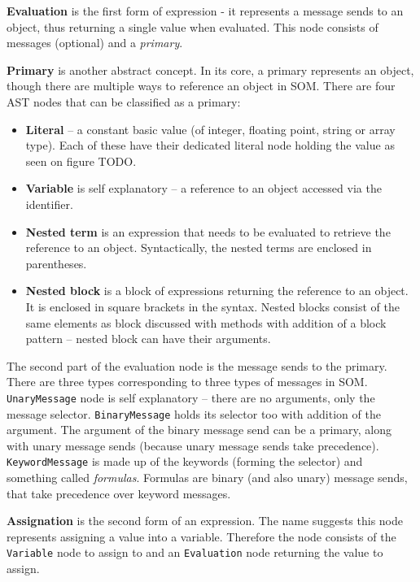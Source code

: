 \documentclass[thesis=M,english]{FITthesis}[2019/12/23]
\begin{document}
\textbf{Evaluation} is the first form of expression - it represents a message sends to an object, thus returning a single value when evaluated. This node
consists of messages (optional) and a \textit{primary}.

\textbf{Primary} is another abstract concept. In its core, a primary represents an object, though there are multiple ways to reference an object in SOM.
There are four AST nodes that can be classified as a primary:
\begin{itemize}
	\item \textbf{Literal} -- a constant basic value (of integer, floating point, string or array type). Each of these have their dedicated literal node
		holding the value as seen on figure TODO.
	\item \textbf{Variable} is self explanatory -- a reference to an object accessed via the identifier.
	\item \textbf{Nested term} is an expression that needs to be evaluated to retrieve the reference to an object. Syntactically, the nested terms
		are enclosed in parentheses.
	\item \textbf{Nested block} is a block of expressions returning the reference to an object. It is enclosed in square brackets in the syntax.
		Nested blocks consist of the same elements as block discussed with methods with addition of a block pattern -- nested block can have their arguments. %
\end{itemize}

The second part of the evaluation node is the message sends to the primary. There are three types corresponding to three types of messages in SOM.
\texttt{UnaryMessage} node is self explanatory -- there are no arguments, only the message selector. \texttt{BinaryMessage} holds its selector too
with addition of the argument. The argument of the binary message send can be a primary, along with unary message sends (because unary message sends take
precedence). \texttt{KeywordMessage} is made up of the keywords (forming the selector) and something called \textit{formulas}. Formulas are binary (and also unary) message
sends, that take precedence over keyword messages.

\textbf{Assignation} is the second form of an expression. The name suggests this node represents assigning a value into a variable. Therefore the node consists
of the \texttt{Variable} node to assign to and an \texttt{Evaluation} node returning the value to assign.
\end{document}
